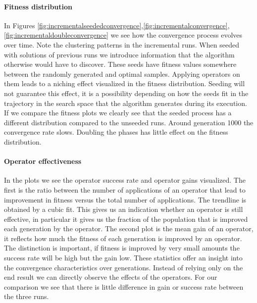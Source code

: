 \paragraph{Fitness distribution}
In Figures \ref{fig:incrementalseededconvergence},\ref{fig:incrementalconvergence},\ref{fig:incrementaldoubleconvergence} we see how the convergence process evolves over time. 
Note the clustering patterns in the incremental runs. When seeded with solutions of previous runs we introduce information that the algorithm otherwise would have to discover. These seeds have fitness values somewhere between the randomly generated and optimal samples. Applying operators on them leads to a niching effect visualized in the fitness distribution. Seeding will not guarantee this effect, it is a possibility depending on how the seeds fit in the trajectory in the search space that the algorithm generates during its execution.
If we compare the fitness plots we clearly see that the seeded process has a different distribution compared to the unseeded runs. Around generation 1000 the convergence rate slows. Doubling the phases has little effect on the fitness distribution. 
\paragraph{Operator effectiveness}
In the plots we see the operator success rate and operator gains visualized. The first is the ratio between the number of applications of an operator that lead to improvement in fitness versus the total number of applications. The trendline is obtained by a cubic fit. This gives us an indication whether an operator is still effective, in particular it gives us the fraction of the population that is improved each generation by the operator. The second plot is the mean gain of an operator, it reflects how much the fitness of each generation is improved by an operator. The distinction is important, if fitness is improved by very small amounts the success rate will be high but the gain low. These statistics offer an insight into the convergence characteristics over generations. Instead of relying only on the end result we can directly observe the effects of the operators. For our comparison we see that there is little difference in gain or success rate between the three runs.
